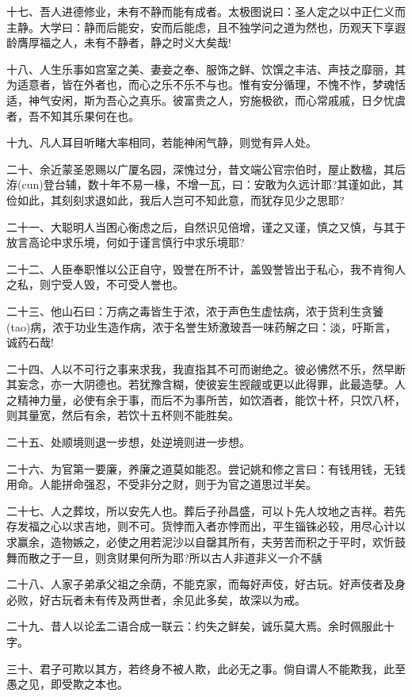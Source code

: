 \documentclass[letterpaper,10pt,english]{sphinxmanual}
\begin{document}
十七、吾人进德修业，未有不静而能有成者。太极图说曰：圣人定之以中正仁义而主静。大学曰：静而后能安，安而后能虑，且不独学问之道为然也，历观天下享遐龄膺厚福之人，未有不静者，静之时义大矣哉!

十八、人生乐事如宫室之美、妻妾之奉、服饰之鲜、饮馔之丰洁、声技之靡丽，其为适意者，皆在外者也，而心之乐不乐不与也。惟有安分循理，不愧不怍，梦魂恬适，神气安闲，斯为吾心之真乐。彼富贵之人，穷施极欲，而心常戚戚，日夕忧虞者，吾不知其乐果何在也。

十九、凡人耳目听睹大率相同，若能神闲气静，则觉有异人处。

二十、余近蒙圣恩赐以广厦名园，深愧过分，昔文端公官宗伯时，屋止数楹，其后洊(cun)登台辅，数十年不易一椽，不增一瓦，曰：安敢为久远计耶?其谨如此，其俭如此，其刻刻求退如此，我后人岂可不知此意，而犹存见少之思耶?

二十一、大聪明人当困心衡虑之后，自然识见倍增，谨之又谨，慎之又慎，与其于放言高论中求乐境，何如于谨言慎行中求乐境耶?

二十二、人臣奉职惟以公正自守，毁誉在所不计，盖毁誉皆出于私心，我不肯徇人之私，则宁受人毁，不可受人誉也。

二十三、他山石曰：万病之毒皆生于浓，浓于声色生虚怯病，浓于货利生贪饕(tao)病，浓于功业生造作病，浓于名誉生矫激玻吾一味药解之曰：淡，吁斯言，诚药石哉!

二十四、人以不可行之事来求我，我直指其不可而谢绝之。彼必怫然不乐，然早断其妄念，亦一大阴德也。若犹豫含糊，使彼妄生觊觎或更以此得罪，此最造孽。人之精神力量，必使有余于事，而后不为事所苦，如饮酒者，能饮十杯，只饮八杯，则其量宽，然后有余，若饮十五杯则不能胜矣。

二十五、处顺境则退一步想，处逆境则进一步想。

二十六、为官第一要廉，养廉之道莫如能忍。尝记姚和修之言曰：有钱用钱，无钱用命。人能拼命强忍，不受非分之财，则于为官之道思过半矣。

二十七、人之葬坟，所以安先人也。葬后子孙昌盛，可以卜先人坟地之吉祥。若先存发福之心以求吉地，则不可。货悖而入者亦悖而出，平生锱铢必较，用尽心计以求赢余，造物嫉之，必使之用若泥沙以自罄其所有，夫劳苦而积之于平时，欢忻鼓舞而散之于一旦，则贪财果何所为耶?所以古人非道非义一介不龋

二十八、人家子弟承父祖之余荫，不能克家，而每好声伎，好古玩。好声伎者及身必败，好古玩者未有传及两世者，余见此多矣，故深以为戒。

二十九、昔人以论孟二语合成一联云：约失之鲜矣，诚乐莫大焉。余时佩服此十字。

三十、君子可欺以其方，若终身不被人欺，此必无之事。倘自谓人不能欺我，此至愚之见，即受欺之本也。
\end{document}
